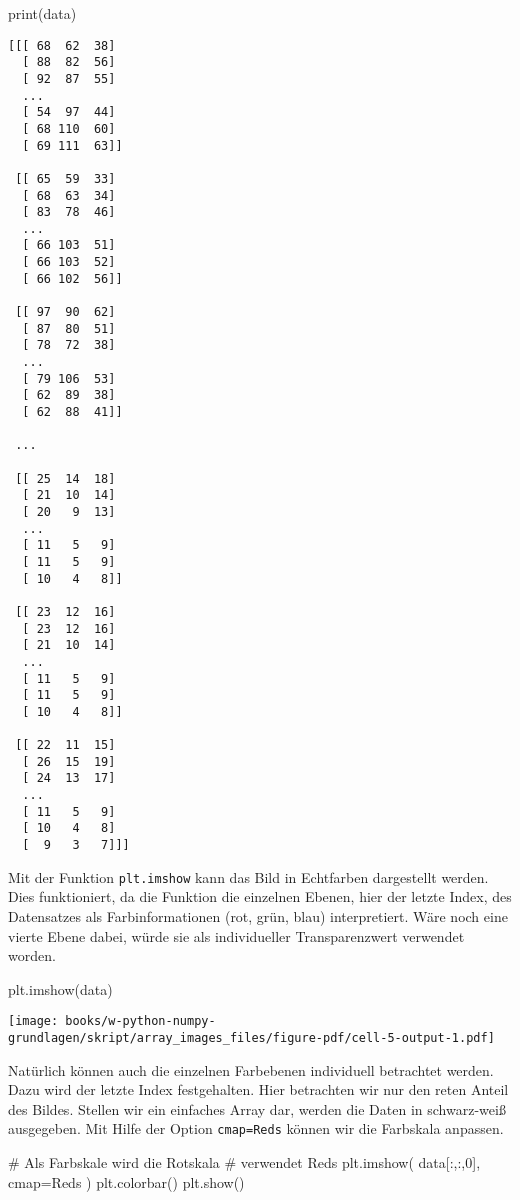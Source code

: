 \documentclass[
  letterpaper,
  DIV=11,
  numbers=noendperiod]{scrreprt}
\newenvironment{Shaded}{\begin{snugshade}}{\end{snugshade}}
\newcommand{\BuiltInTok}[1]{\textcolor[rgb]{0.00,0.23,0.31}{#1}}
\newcommand{\CommentTok}[1]{\textcolor[rgb]{0.37,0.37,0.37}{#1}}
\newcommand{\DecValTok}[1]{\textcolor[rgb]{0.68,0.00,0.00}{#1}}
\newcommand{\NormalTok}[1]{\textcolor[rgb]{0.00,0.23,0.31}{#1}}
\newcommand{\OperatorTok}[1]{\textcolor[rgb]{0.37,0.37,0.37}{#1}}
\newcommand{\StringTok}[1]{\textcolor[rgb]{0.13,0.47,0.30}{#1}}
\begin{document}
\begin{tcolorbox}
\begin{Shaded}
\begin{Highlighting}[]
\BuiltInTok{print}\NormalTok{(data)}
\end{Highlighting}
\end{Shaded}

\begin{verbatim}
[[[ 68  62  38]
  [ 88  82  56]
  [ 92  87  55]
  ...
  [ 54  97  44]
  [ 68 110  60]
  [ 69 111  63]]

 [[ 65  59  33]
  [ 68  63  34]
  [ 83  78  46]
  ...
  [ 66 103  51]
  [ 66 103  52]
  [ 66 102  56]]

 [[ 97  90  62]
  [ 87  80  51]
  [ 78  72  38]
  ...
  [ 79 106  53]
  [ 62  89  38]
  [ 62  88  41]]

 ...

 [[ 25  14  18]
  [ 21  10  14]
  [ 20   9  13]
  ...
  [ 11   5   9]
  [ 11   5   9]
  [ 10   4   8]]

 [[ 23  12  16]
  [ 23  12  16]
  [ 21  10  14]
  ...
  [ 11   5   9]
  [ 11   5   9]
  [ 10   4   8]]

 [[ 22  11  15]
  [ 26  15  19]
  [ 24  13  17]
  ...
  [ 11   5   9]
  [ 10   4   8]
  [  9   3   7]]]
\end{verbatim}

Mit der Funktion \texttt{plt.imshow} kann das Bild in Echtfarben
dargestellt werden. Dies funktioniert, da die Funktion die einzelnen
Ebenen, hier der letzte Index, des Datensatzes als Farbinformationen
(rot, grün, blau) interpretiert. Wäre noch eine vierte Ebene dabei,
würde sie als individueller Transparenzwert verwendet worden.

\begin{Shaded}
\begin{Highlighting}[]
\NormalTok{plt.imshow(data)}
\end{Highlighting}
\end{Shaded}

\texttt{[image: books/w-python-numpy-grundlagen/skript/array\_images\_files/figure-pdf/cell-5-output-1.pdf]}

Natürlich können auch die einzelnen Farbebenen individuell betrachtet
werden. Dazu wird der letzte Index festgehalten. Hier betrachten wir nur
den reten Anteil des Bildes. Stellen wir ein einfaches Array dar, werden
die Daten in schwarz-weiß ausgegeben. Mit Hilfe der Option
\texttt{cmap=\textquotesingle{}Reds\textquotesingle{}} können wir die
Farbskala anpassen.

\begin{Shaded}
\begin{Highlighting}[]
\CommentTok{\# Als Farbskale wird die Rotskala }
\CommentTok{\# verwendet \textquotesingle{}Reds\textquotesingle{}}
\NormalTok{plt.imshow( data[:,:,}\DecValTok{0}\NormalTok{], cmap}\OperatorTok{=}\StringTok{\textquotesingle{}Reds\textquotesingle{}}\NormalTok{ )}
\NormalTok{plt.colorbar()}
\NormalTok{plt.show()}
\end{Highlighting}
\end{Shaded}


\end{tcolorbox}
\end{document}
